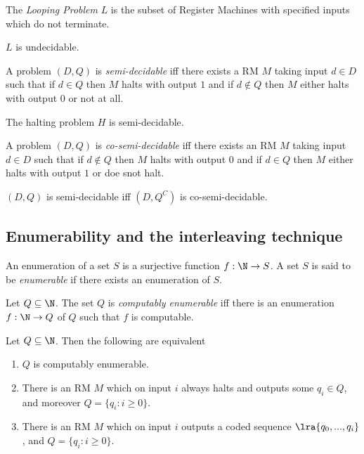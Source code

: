 \documentclass{article}
\begin{document}
\begin{definition}
	The \emph{Looping Problem} $L$ is the subset of Register Machines with specified
	inputs which do not terminate.
\end{definition}

\begin{theorem}
	$L$ is undecidable.
\end{theorem}

\begin{definition}
	A problem $(D,Q)$ is \emph{semi-decidable} iff there exists a RM $M$ taking
	input $d\in D$ such that if $d\in Q$ then $M$ halts with output $1$ and if
	$d\not\in Q$ then $M$ either halts with output $0$ or not at all.
\end{definition}

\begin{corollary}
	The halting problem $H$ is semi-decidable.
\end{corollary}

\begin{definition}
	A problem $(D,Q)$ is \emph{co-semi-decidable} iff there exists an RM $M$
	taking input $d\in D$ such that if $d\not\in Q$ then $M$ halts with output
	$0$ and if $d\in Q$ then $M$ either halts with output $1$ or doe snot halt.
\end{definition}

\begin{theorem}
	$(D,Q)$ is semi-decidable iff $(D, Q^C)$ is co-semi-decidable.
\end{theorem}

\subsection{Enumerability and the interleaving technique}

\begin{definition}
	An enumeration of a set $S$ is a surjective function $f:\N\to S$. A set $S$
	is said to be \emph{enumerable} if there exists an enumeration of $S$.
\end{definition}

\begin{definition}
	Let $Q\subseteq\N$. The set $Q$ is \emph{computably enumerable} iff there is
	an enumeration $f:\N\to Q$ of $Q$ such that $f$ is computable.
\end{definition}

\begin{theorem}
	Let $Q\subseteq\N$. Then the following are equivalent
	\begin{enumerate}
		\item $Q$ is computably enumerable.
		\item There is an RM $M$ which on input $i$ always halts and outputs some $q_i\in Q$,
		      and moreover $Q=\{q_i : i\geq 0\}$.
		\item There is an RM $M$ which on input $i$ outputs a coded sequence $\lra{q_0,...,q_i}$,
		      and $Q=\{q_i:i\geq 0\}$.
	\end{enumerate}
\end{theorem}
\end{document}
